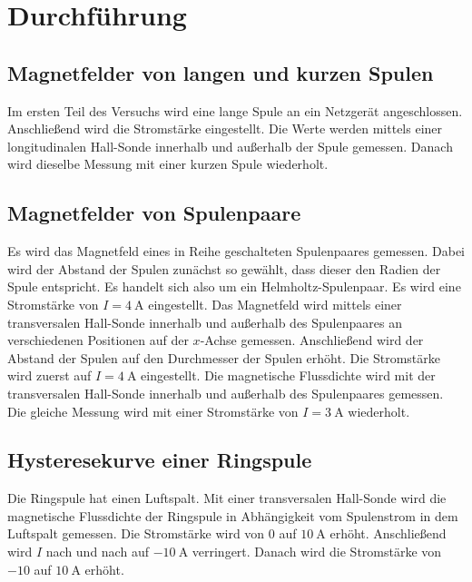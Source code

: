 \section{Durchführung}
\label{sec:Durchfuehrung}

\subsection{Magnetfelder von langen und kurzen Spulen}
Im ersten Teil des Versuchs wird eine lange Spule an ein Netzgerät angeschlossen. 
Anschließend wird die Stromstärke eingestellt.
Die Werte werden mittels einer longitudinalen Hall-Sonde innerhalb und außerhalb der
Spule gemessen. Danach wird dieselbe Messung mit einer kurzen Spule 
wiederholt. 

\subsection{Magnetfelder von Spulenpaare} %
Es wird das Magnetfeld eines in Reihe geschalteten Spulenpaares gemessen. Dabei wird
der Abstand der Spulen zunächst so gewählt, dass dieser den Radien der Spule entspricht.
Es handelt sich also um ein Helmholtz-Spulenpaar. Es wird eine Stromstärke von
$I= \SI{4}{\ampere}$ eingestellt. Das Magnetfeld wird mittels einer 
transversalen Hall-Sonde innerhalb und außerhalb des Spulenpaares an verschiedenen Positionen auf der $x$-Achse gemessen.
\newline
Anschließend wird der Abstand der Spulen auf den Durchmesser der Spulen erhöht.
Die Stromstärke wird zuerst auf $I= \SI{4}{\ampere}$ eingestellt.
Die magnetische Flussdichte wird mit der transversalen Hall-Sonde innerhalb und
außerhalb des Spulenpaares gemessen.
\newline
Die gleiche Messung wird mit einer Stromstärke von
$I = \SI{3}{\ampere}$ wiederholt.

\subsection {Hysteresekurve einer Ringspule} 
Die Ringspule hat einen Luftspalt. Mit einer transversalen Hall-Sonde wird die 
magnetische Flussdichte der Ringspule in Abhängigkeit vom Spulenstrom in dem Luftspalt gemessen.
Die Stromstärke wird von $\num{0}$ auf $\SI{10}{\ampere}$ erhöht.%
Anschließend wird $I$ nach und nach auf $\SI{-10}{\ampere}$ verringert. Danach wird die Stromstärke
von $\num{-10}$ auf $\SI{10}{\ampere}$ erhöht.


